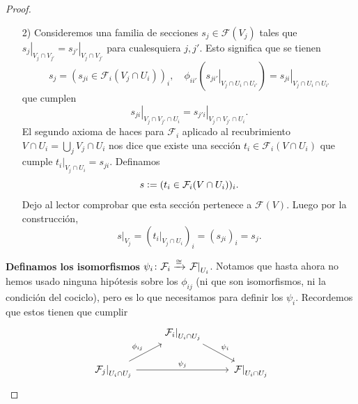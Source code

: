 \documentclass{article}
\numberwithin{equation}{section}
\theoremstyle{definition}
\begin{document}
\begin{proof}
\begin{enumerate}
  \item[2)] Consideremos una familia de secciones $s_j \in \mathcal{F} (V_j)$
    tales que
    $\left.s_j\right|_{V_j\cap V_{j'}} = \left.s_{j'}\right|_{V_j\cap V_{j'}}$
    para cualesquiera $j,j'$. Esto significa que se tienen
    \[ s_j = (s_{ji} \in \mathcal{F}_i (V_j \cap U_i))_i, \quad
      \phi_{ii'} (\left.s_{ji'}\right|_{V_j\cap U_i \cap U_{i'}}) =
      \left.s_{ji}\right|_{V_j\cap U_i \cap U_{i'}} \]
    que cumplen
    \[ \left.s_{ji}\right|_{V_j \cap V_{j'} \cap U_i} =
       \left.s_{j'i}\right|_{V_j \cap V_{j'} \cap U_i}. \]
    El segundo axioma de haces para $\mathcal{F}_i$ aplicado al recubrimiento
    $V \cap U_i = \bigcup_j V_j \cap U_i$ nos dice que existe una sección
    $t_i \in \mathcal{F}_i (V \cap U_i)$ que cumple
    $\left.t_i\right|_{V_j \cap U_i} = s_{ji}$. Definamos
    $$s \mathrel{\mathop:}= (t_i \in \mathcal{F}_i (V \cap U_i))_i.$$
    Dejo al lector comprobar que esta sección pertenece a $\mathcal{F}
    (V)$. Luego por la construcción,
    $$\left.s\right|_{V_j} = (\left.t_i\right|_{V_j \cap U_i})_i = (s_{ji})_i = s_j.$$

  \end{enumerate}

  \vspace{1em}

  \textbf{Definamos los isomorfismos
    $\psi_i\colon \mathcal{F}_i \xrightarrow{\cong} \left.\mathcal{F}\right|_{U_i}$}.
  Notamos que hasta ahora no hemos usado ninguna hipótesis sobre los $\phi_{ij}$
  (ni que son isomorfismos, ni la condición del cociclo), pero es lo que
  necesitamos para definir los $\psi_i$. Recordemos que estos tienen que cumplir
  \[ \begin{tikzcd}
      & \left.\mathcal{F}_i\right|_{U_i\cap U_j}\ar{dr}{\psi_i} \\
      \left.\mathcal{F}_j\right|_{U_i \cap U_j} \ar{rr}{\psi_j}\ar{ur}{\phi_{ij}} && \left.\mathcal{F}\right|_{U_i \cap U_j}
    \end{tikzcd} \]


\end{proof}
\end{document}
